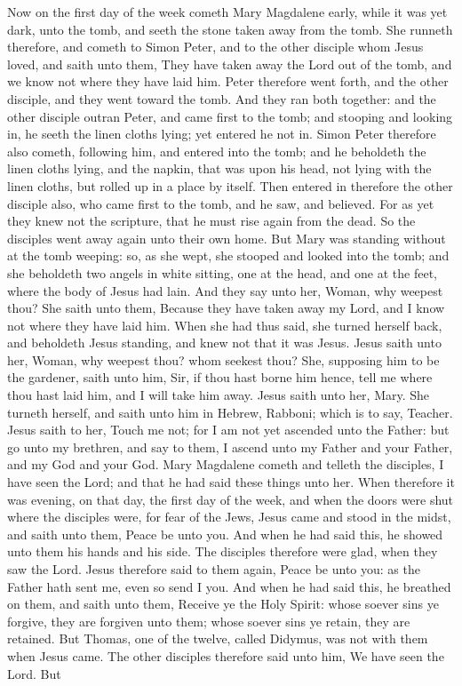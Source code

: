 Now on the first day of the week cometh Mary Magdalene early, while it was yet dark, unto the tomb, and seeth the stone taken away from the tomb. She runneth therefore, and cometh to Simon Peter, and to the other disciple whom Jesus loved, and saith unto them, They have taken away the Lord out of the tomb, and we know not where they have laid him. Peter therefore went forth, and the other disciple, and they went toward the tomb. And they ran both together: and the other disciple outran Peter, and came first to the tomb; and stooping and looking in, he seeth the linen cloths lying; yet entered he not in. Simon Peter therefore also cometh, following him, and entered into the tomb; and he beholdeth the linen cloths lying, and the napkin, that was upon his head, not lying with the linen cloths, but rolled up in a place by itself. Then entered in therefore the other disciple also, who came first to the tomb, and he saw, and believed. For as yet they knew not the scripture, that he must rise again from the dead. So the disciples went away again unto their own home.  But Mary was standing without at the tomb weeping: so, as she wept, she stooped and looked into the tomb; and she beholdeth two angels in white sitting, one at the head, and one at the feet, where the body of Jesus had lain. And they say unto her, Woman, why weepest thou? She saith unto them, Because they have taken away my Lord, and I know not where they have laid him. When she had thus said, she turned herself back, and beholdeth Jesus standing, and knew not that it was Jesus. Jesus saith unto her, Woman, why weepest thou? whom seekest thou? She, supposing him to be the gardener, saith unto him, Sir, if thou hast borne him hence, tell me where thou hast laid him, and I will take him away. Jesus saith unto her, Mary. She turneth herself, and saith unto him in Hebrew, Rabboni; which is to say, Teacher. Jesus saith to her, Touch me not; for I am not yet ascended unto the Father: but go unto my brethren, and say to them, I ascend unto my Father and your Father, and my God and your God. Mary Magdalene cometh and telleth the disciples, I have seen the Lord; and that he had said these things unto her.  When therefore it was evening, on that day, the first day of the week, and when the doors were shut where the disciples were, for fear of the Jews, Jesus came and stood in the midst, and saith unto them, Peace be unto you. And when he had said this, he showed unto them his hands and his side. The disciples therefore were glad, when they saw the Lord. Jesus therefore said to them again, Peace be unto you: as the Father hath sent me, even so send I you. And when he had said this, he breathed on them, and saith unto them, Receive ye the Holy Spirit: whose soever sins ye forgive, they are forgiven unto them; whose soever sins ye retain, they are retained.  But Thomas, one of the twelve, called Didymus, was not with them when Jesus came. The other disciples therefore said unto him, We have seen the Lord. But 